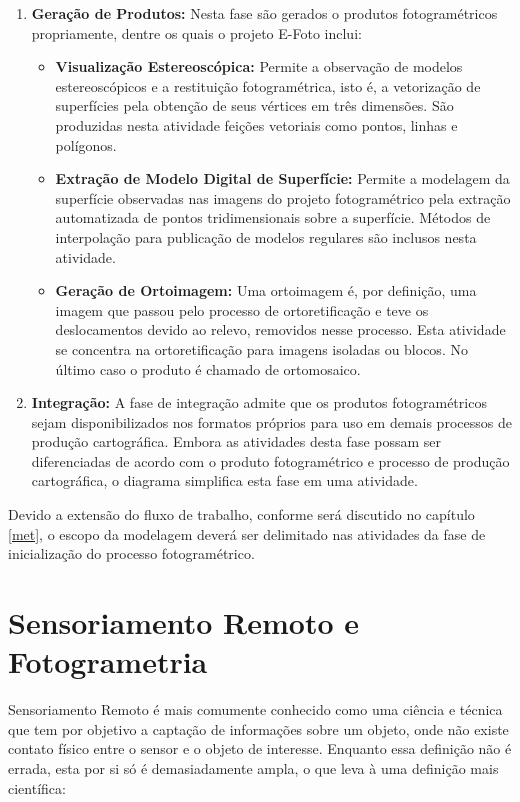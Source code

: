 \begin{enumerate}
\begin{itemize}
    \end{itemize}
    \item \textbf{Geração de Produtos:}  Nesta fase são gerados o produtos fotogramétricos propriamente, dentre os quais o projeto E-Foto inclui:
    \begin{itemize}
        \item \textbf{Visualização Estereoscópica:} Permite a observação de modelos estereoscópicos e a restituição fotogramétrica, isto é, a vetorização de superfícies pela obtenção de seus vértices em três dimensões. São produzidas nesta atividade feições vetoriais como pontos, linhas e polígonos.
        \item \textbf{Extração de Modelo Digital de Superfície:} Permite a modelagem da superfície observadas nas imagens do projeto fotogramétrico pela extração automatizada de pontos tridimensionais sobre a superfície. Métodos de interpolação para publicação de modelos regulares são inclusos nesta atividade.
        \item \textbf{Geração de Ortoimagem:} Uma ortoimagem é, por definição, uma imagem que passou pelo processo de ortoretificação e teve os deslocamentos devido ao relevo, removidos nesse processo. Esta atividade se concentra na ortoretificação para imagens isoladas ou blocos. No último caso o produto é chamado de ortomosaico.
    \end{itemize}
    \item \textbf{Integração:} A fase de integração admite que os produtos fotogramétricos sejam disponibilizados nos formatos próprios para uso em demais processos de produção cartográfica. Embora as atividades desta fase possam ser diferenciadas de acordo com o produto fotogramétrico e processo de produção cartográfica, o diagrama simplifica esta fase em uma atividade.
\end{enumerate}

Devido a extensão do fluxo de trabalho, conforme será discutido no capítulo \ref{met}, o escopo da modelagem deverá ser delimitado nas atividades da fase de inicialização do processo fotogramétrico.



\section{Sensoriamento Remoto e Fotogrametria} \label{sensofot}
Sensoriamento Remoto é mais comumente conhecido como uma ciência e técnica que tem por objetivo a captação de informações sobre um objeto, onde não existe contato físico entre o sensor e o objeto de interesse.  Enquanto essa definição não é errada, esta por si só é demasiadamente ampla, o que leva à uma definição mais científica: 

